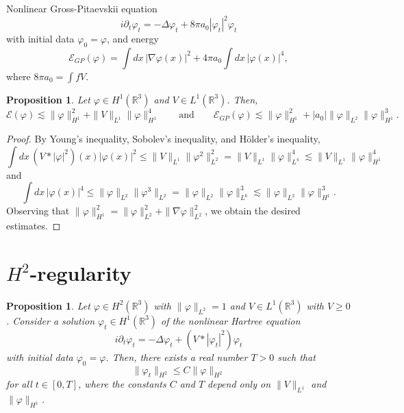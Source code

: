 \documentclass[11pt,a4paper]{scrartcl} %
\newtheorem{prp}[thm]{Proposition}
\newcommand{\R}{\mathds{R}}
\begin{document}
Nonlinear Gross-Pitaevskii equation
\begin{displaymath}
  i \partial_t \varphi_t = - \Delta \varphi_t + 8 \pi a_0 |\varphi_t|^2
  \varphi_t
\end{displaymath}
with initial data $\varphi_0 = \varphi$, and energy
\begin{displaymath}
  \mathcal{E}_{GP}(\varphi) = \int dx \, |\nabla \varphi(x)|^2 + 4 \pi a_0
  \int dx \, |\varphi(x)|^4,
\end{displaymath}
where $8 \pi a_0 = \int f V$.


\begin{prp}
  \label{p:energy}
  Let $\varphi \in H^1(\R^3)$ and $V \in L^1(\R^3)$. Then,
  \begin{displaymath}
    \mathcal{E}(\varphi) \apprle \| \varphi \|_{H^1}^2 + \| V \|_{L^1} \|
    \varphi \|_{H^1}^4 \qquad \text{and} \qquad \mathcal{E}_{GP}(\varphi)
    \apprle \| \varphi \|_{H^1}^2 + |a_0| \| \varphi \|_{L^2} \| \varphi
    \|_{H^1}^3.
  \end{displaymath}
\end{prp}


\begin{proof}
  By Young's inequality, Sobolev's inequality, and H\"older's inequality, 
  \begin{displaymath}
    \int dx \, (V * |\varphi|^2)(x) |\varphi(x)|^2 \le \| V \|_{L^1} \|
    \varphi^2 \|_{L^2}^2 = \| V \|_{L^1} \| \varphi \|_{L^4}^4 \apprle \| V
    \|_{L^1} \| \varphi \|_{H^1}^4
  \end{displaymath}
  and
  \begin{displaymath}
    \int dx \, |\varphi(x)|^4 \le \| \varphi \|_{L^2} \| \varphi^3 \|_{L^2} =
    \| \varphi \|_{L^2} \| \varphi \|_{L^6}^3 \apprle \| \varphi \|_{L^2} \|
    \varphi \|_{H^1}^3.
  \end{displaymath}
  Observing that $\| \varphi \|_{H^1}^2 = \| \varphi \|_{L^2}^2 + \| \nabla
  \varphi \|_{L^2}^2$, we obtain the desired estimates.
\end{proof}


\section{$H^2$-regularity}


\begin{prp}
  \label{p:reg1}
  Let $\varphi \in H^2(\R^3)$ with $\| \varphi \|_{L^2} = 1$ and $V \in
  L^1(\R^3)$ with $V \ge 0$. Consider a solution $\varphi_t \in H^1(\R^3)$ of
  the nonlinear Hartree equation
  \begin{displaymath}
    i \partial_t \varphi_t = - \Delta \varphi_t + (V * |\varphi_t|^2)
    \varphi_t
  \end{displaymath}
  with initial data $\varphi_0 = \varphi$. Then, there exists a real number $T
  > 0$ such that
  \begin{displaymath}
    \| \varphi_t \|_{H^2} \le C \| \varphi \|_{H^2}
  \end{displaymath}
  for all $t \in [0,T]$, where the constants $C$ and $T$ depend only on $\| V
  \|_{L^1}$ and $\| \varphi \|_{H^1}$.
\end{prp}
\end{document}
